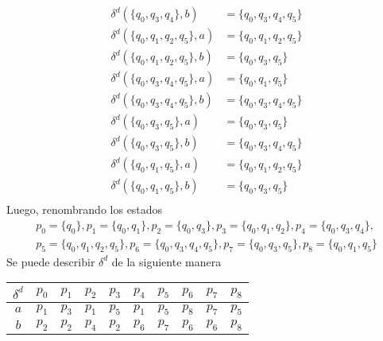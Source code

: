 \documentclass{article}
\begin{document}
\begin{enumerate}
{\begin{itemize}
\begin{enumerate}
{\begin{align*}
                            \delta^{d}(\{q_{0}, q_{3}, q_{4}\}, b) &= \{q_{0}, q_{3}, q_{4}, q_{5}\}\\
                            \delta^{d}(\{q_{0}, q_{1}, q_{2}, q_{5}\}, a) &= \{q_{0}, q_{1}, q_{2}, q_{5}\} \\
                            \delta^{d}(\{q_{0}, q_{1}, q_{2}, q_{5}\}, b) &= \{q_{0}, q_{3}, q_{5}\} \\
                            \delta^{d}(\{q_{0}, q_{3}, q_{4}, q_{5}\}, a) &= \{q_{0}, q_{1}, q_{5}\}  \\
                            \delta^{d}(\{q_{0}, q_{3}, q_{4}, q_{5}\}, b) &= \{q_{0}, q_{3}, q_{4}, q_{5}\} \\
                            \delta^{d}(\{q_{0}, q_{3}, q_{5}\}, a) &= \{q_{0}, q_{3}, q_{5}\}\\
                            \delta^{d}(\{q_{0}, q_{3}, q_{5}\}, b) &= \{q_{0}, q_{3}, q_{4}, q_{5}\} \\
                            \delta^{d}(\{q_{0}, q_{1}, q_{5}\}, a) &= \{q_{0}, q_{1}, q_{2}, q_{5}\}\\
                            \delta^{d}(\{q_{0}, q_{1}, q_{5}\}, b) &= \{q_{0}, q_{3}, q_{5}\} \\
                        \end{align*}
                        Luego, renombrando los estados
                        \begin{align*}
                            p_0 = \{q_{0}\}, p_1 = \{q_{0}, q_{1}\}, 
                            p_2 = \{q_{0}, q_{3}\}, p_3 = \{q_{0}, q_{1}, q_{2}\},
                            p_4 = \{q_{0}, q_{3}, q_{4}\}, \\
                            p_5 = \{q_{0}, q_{1}, q_{2}, q_{5}\},
                            p_6 = \{q_{0}, q_{3}, q_{4}, q_{5}\},
                            p_7 = \{q_{0}, q_{3}, q_{5}\},
                            p_8 = \{q_{0}, q_{1}, q_{5}\}
                        \end{align*}
                        Se puede describir $\delta^{d}$ de la siguiente manera

                        \begin{table}[H]
                            \centering
                            \begin{tabular}{|c|c|c|c|c|c|c|c|c|c|}
                            \hline
                            $\delta^{d}$ & $p_0$ & $p_1$ & $p_2$ & $p_3$ & $p_4$ & $p_5$ & $p_6$ & $p_7$ & $p_8$ \\ \hline
                            $a$          & $p_1$ & $p_3$ & $p_1$ & $p_5$ & $p_1$ & $p_5$ & $p_8$ & $p_7$ & $p_5$ \\ \hline
                            $b$          & $p_2$ & $p_2$ & $p_4$ & $p_2$ & $p_6$ & $p_7$ & $p_6$ & $p_6$ & $p_8$ \\ \hline
                            \end{tabular}
                        \end{table}
                    }
                \end{enumerate}
                

\end{itemize}}
\end{enumerate}
\end{document}
